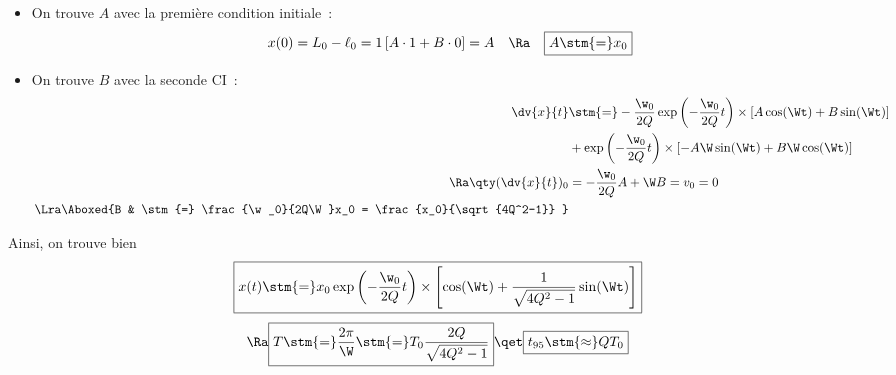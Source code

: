 \documentclass[a4paper, 10pt, final, garamond]{book}
\begin{document}
\begin{enumerate}[label=\sqenumi, leftmargin=10pt]
\begin{isd}[sidebyside align=top]
{\begin{itemize}
				      \item On trouve $A$ avec la première condition initiale~:
				            \begin{gather*}
					            x(0) = L_0 - \ell_0 =
					            1 \left[ A \cdot 1 + B \cdot 0 \right] = A
					            \quad \Ra \quad
					            \boxed{A \stm{=} x_0}
				            \end{gather*}
				      \item On trouve $B$ avec la seconde CI~:
				            \begin{align*}
					            \dv{x}{t}           & \stm{=}
					            -\frac{\w_0}{2Q}\exp \left( -\frac{\w_0}{2Q}t \right)
					            \times
					            \left[ A\cos(\Wt) + B\sin(\Wt) \right]
					            \\
					                                & +
					            \exp \left( -\frac{\w_0}{2Q}t \right)
					            \times
					            \left[ -A\W\sin(\Wt) + B\W\cos(\Wt) \right]
					            \\\Ra
					            \qty(\dv{x}{t})_{0} & =
					            - \frac{\w_0}{2Q}A + \W B = v_0 = 0
					            \\\Lra
					            \Aboxed{%
					            B                   & \stm{=}
						            \frac{\w_0}{2Q\W}x_0 = \frac{x_0}{\sqrt{4Q^2-1}}
					            }
				            \end{align*}
			      \end{itemize}
			      Ainsi, on trouve bien
			      \[
				      \boxed{
					      x(t) \stm{=} x_0\exp \left( -\frac{\w_0}{2Q}t \right)\times
					      \left[
						      \cos(\Wt) + \frac{1}{\sqrt{4Q^2 - 1}}\sin(\Wt)
						      \right]
				      }
			      \]
			      \begin{equation*}
				      \Ra
				      \boxed{
					      T \stm{=}
					      \frac{2\pi}{\W} \stm{=}
					      T_0 \frac{2Q}{\sqrt{4Q^{2} - 1}}
				      }
				      \qet
				      \boxed{t_{95} \stm{\approx} QT_0}
			      \end{equation*}
		      }
		      \begin{center}
\end{center}
\end{isd}
\end{enumerate}
\end{document}
